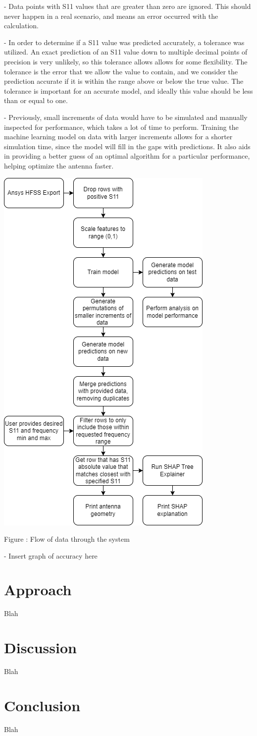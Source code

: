 \documentclass[11pt, notitlepage]{article}
\newcounter{figure_counter}
\newcommand\figuretitle{\addtocounter{figure_counter}{1}Figure \arabic{figure_counter}: }
\begin{document}
\begin{multicols}{2}
- Data points with S11 values that are greater than zero are ignored. This should never happen in a real scenario, and means an error occurred with the calculation.

- In order to determine if a S11 value was predicted accurately, a tolerance was utilized. An exact prediction of an S11 value down to multiple decimal points of precision is very unlikely, so this tolerance allows allows for some flexibility. The tolerance is the error that we allow the value to contain, and we consider the prediction accurate if it is within the range above or below the true value. The tolerance is important for an accurate model, and ideally this value should be less than or equal to one.

- Previously, small increments of data would have to be simulated and manually inspected for performance, which takes a lot of time to perform. Training the machine learning model on data with larger increments allows for a shorter simulation time, since the model will fill in the gaps with predictions. It also aids in providing a better guess of an optimal algorithm for a particular performance, helping optimize the antenna faster. 

\begin{center}
  \includegraphics[width=.5\textwidth]{methodology}
  \figuretitle Flow of data through the system
\end{center}

- Insert graph of accuracy here 


\section{Approach}
Blah


\section{Discussion}
Blah


\section{Conclusion}
Blah






\end{multicols}
\end{document}
